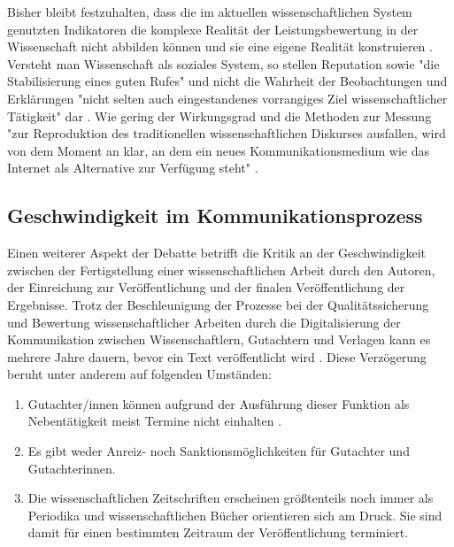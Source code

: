 Bisher bleibt festzuhalten, dass die im aktuellen wissenschaftlichen System genutzten Indikatoren die komplexe Realität der Leistungsbewertung in der Wissenschaft nicht abbilden können und sie eine eigene Realität konstruieren \cite[:188]{Hornbostel_1997}. Versteht man Wissenschaft als soziales System, so stellen Reputation sowie "die Stabilisierung eines guten Rufes" und nicht die Wahrheit der Beobachtungen und Erklärungen "nicht selten auch eingestandenes vorrangiges Ziel wissenschaftlicher Tätigkeit" dar \cite[:237]{Luhmann_1970}. Wie gering der Wirkungsgrad und die Methoden zur Messung "zur Reproduktion des traditionellen wissenschaftlichen Diskurses ausfallen, wird von dem Moment an klar, an dem ein neues Kommunikationsmedium wie das Internet als Alternative zur Verfügung steht" \cite{Rost_1998}.

\subsection{Geschwindigkeit im Kommunikationsprozess}

Einen weiterer Aspekt der Debatte betrifft die Kritik an der Geschwindigkeit zwischen der Fertigstellung einer wissenschaftlichen Arbeit durch den Autoren, der Einreichung zur Veröffentlichung und der finalen Veröffentlichung der Ergebnisse. Trotz der Beschleunigung der Prozesse bei der Qualitätssicherung und Bewertung wissenschaftlicher Arbeiten durch die Digitalisierung der Kommunikation zwischen Wissenschaftlern, Gutachtern und Verlagen kann es mehrere Jahre dauern, bevor ein Text veröffentlicht wird \cite{Curry_2015} \cite{Nosek_2012} \cite{Smith_2006}. Diese Verzögerung beruht unter anderem auf folgenden Umständen:

\begin{enumerate}
\item Gutachter/innen können aufgrund der Ausführung dieser Funktion als Nebentätigkeit meist Termine nicht einhalten \cite{Bar_2009}.
\item Es gibt weder Anreiz- noch Sanktionsmöglichkeiten für Gutachter und Gutachterinnen.
\item Die wissenschaftlichen Zeitschriften erscheinen größtenteils noch immer als Periodika und wissenschaftlichen Bücher orientieren sich am Druck. Sie sind damit für einen bestimmten Zeitraum der Veröffentlichung terminiert.
\end{enumerate}

